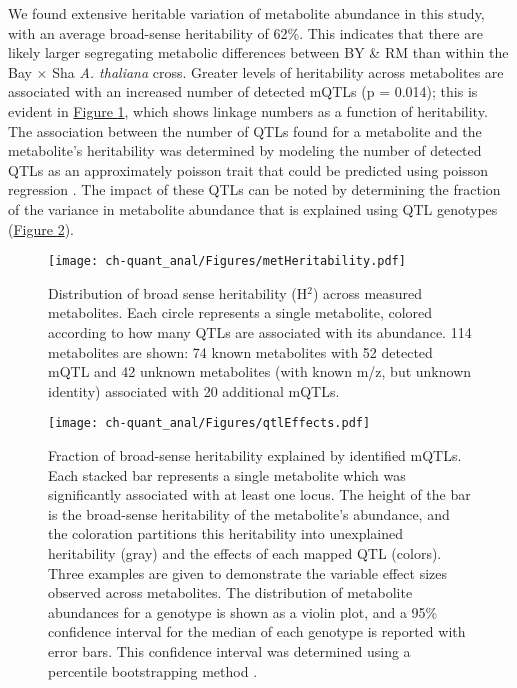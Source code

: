 We found extensive heritable variation of metabolite abundance in this study, with an average broad-sense heritability of 62\%.  This indicates that there are likely larger segregating metabolic differences between BY \& RM than within the Bay $\times$ Sha \textit{A. thaliana} cross. Greater levels of heritability across metabolites are associated with an increased number of detected mQTLs (p = 0.014); this is evident in \hyperref[ch-quant_anal:metHeritability]{Figure \ref{ch-quant_anal:metHeritability}}, which shows linkage numbers as a function of heritability. The association between the number of QTLs found for a metabolite and the metabolite's heritability was determined by modeling the number of detected QTLs as an approximately poisson trait that could be predicted using poisson regression \cite{Cameron:2013tp}. The impact of these QTLs can be noted by determining the fraction of the variance in metabolite abundance that is explained using QTL genotypes (\hyperref[ch-quant_anal:qtlEffects]{Figure \ref{ch-quant_anal:qtlEffects}}).

\begin{figure}[h!]
\begin{center}
\texttt{[image: ch-quant\_anal/Figures/metHeritability.pdf]}
\caption[Distribution of broad sense heritability (H$^{2}$) across measured metabolites]{Distribution of broad sense heritability (H$^{2}$) across measured metabolites. Each circle represents a single metabolite, colored according to how many QTLs are associated with its abundance.  114 metabolites are shown: 74 known metabolites with 52 detected mQTL and 42 unknown metabolites (with known m/z, but unknown identity) associated with 20 additional mQTLs.}
\label{ch-quant_anal:metHeritability}
\end{center}
\end{figure}

\begin{figure}[h!]
\begin{center}
\texttt{[image: ch-quant\_anal/Figures/qtlEffects.pdf]}
\caption[Fraction of broad-sense heritability explained by identified mQTLs]{Fraction of broad-sense heritability explained by identified mQTLs.  Each stacked bar represents a single metabolite which was significantly associated with at least one locus.  The height of the bar is the broad-sense heritability of the metabolite's abundance, and the coloration partitions this heritability into unexplained heritability (gray) and the effects of each mapped QTL (colors).  Three examples are given to demonstrate the variable effect sizes observed across metabolites.  The distribution of metabolite abundances for a genotype is shown as a violin plot, and a 95\% confidence interval for the median of each genotype is reported with error bars.  This confidence interval was determined using a percentile bootstrapping method \cite{Davison:1997vn}.}
\label{ch-quant_anal:qtlEffects}
\end{center}
\end{figure}

